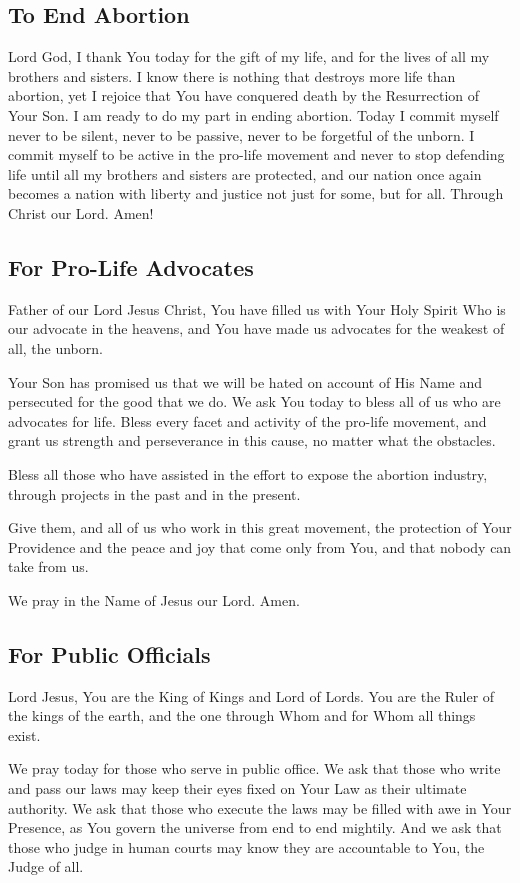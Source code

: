 \documentclass[12pt]{article}
\newcommand{\prayertitle}[1]{\subsection{#1}}
\begin{document}
\prayertitle{To End Abortion}
Lord God, I thank You today for the gift of my life, and for the lives of all my brothers and sisters.
I know there is nothing that destroys more life than abortion, yet I rejoice that You have conquered death by the Resurrection of Your Son. 
I am ready to do my part in ending abortion. Today I commit myself 
never to be silent, 
never to be passive, 
never to be forgetful of the unborn. 
I commit myself to be active in the pro-life movement and never to stop defending life until all my brothers and sisters are protected, and our nation once again becomes a nation with liberty and justice not just for some, but for all.
Through Christ our Lord. Amen!

\prayertitle{For Pro-Life Advocates}
Father of our Lord Jesus Christ,
You have filled us with Your Holy Spirit Who is our advocate in the heavens, and You have made us advocates for the weakest of all, the unborn.

Your Son has promised us that we will be hated on account of His Name and persecuted for the good that we do.
We ask You today to bless all of us who are advocates for life.
Bless every facet and activity of the pro-life movement, and grant us strength and perseverance in this cause, no matter what the obstacles.

Bless all those who have assisted in the effort to expose the abortion industry, through projects in the past and in the present.

Give them, and all of us who work in this great movement, the protection of Your Providence and the peace and joy that come only from You, and that nobody can take from us.

We pray in the Name of Jesus our Lord. Amen.

\prayertitle{For Public Officials}
Lord Jesus,
You are the King of Kings and Lord of Lords.
You are the Ruler of the kings of the earth, and the one through Whom and for Whom all things exist.

We pray today for those who serve in public office.
We ask that those who write and pass our laws may keep their eyes fixed on Your Law as their ultimate authority.
We ask that those who execute the laws may be filled with awe in Your Presence, as You govern the universe from end to end mightily.
And we ask that those who judge in human courts may know they are accountable to You, the Judge of all.
\end{document}
